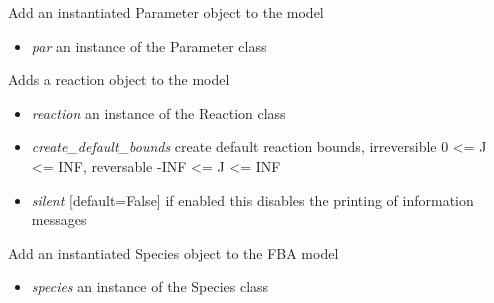 \documentclass[a4paper,11pt,english]{sphinxmanual}
\begin{document}
\begin{fulllineitems}
\begin{fulllineitems}
\label{modules_doc:cbmpy.CBModel.Model.addParameter}
Add an instantiated Parameter object to the model
\begin{itemize}
\item {} 
\emph{par} an instance of the Parameter class

\end{itemize}

\end{fulllineitems}


\begin{fulllineitems}
\label{modules_doc:cbmpy.CBModel.Model.addReaction}
Adds a reaction object to the model
\begin{itemize}
\item {} 
\emph{reaction} an instance of the Reaction class

\item {} 
\emph{create\_default\_bounds} create default reaction bounds, irreversible 0 \textless{}= J \textless{}= INF, reversable -INF \textless{}= J \textless{}= INF

\item {} 
\emph{silent} {[}default=False{]} if enabled this disables the printing of information messages

\end{itemize}

\end{fulllineitems}


\begin{fulllineitems}
\label{modules_doc:cbmpy.CBModel.Model.addSpecies}
Add an instantiated Species object to the FBA model
\begin{itemize}
\item {} 
\emph{species} an instance of the Species class

\end{itemize}

\end{fulllineitems}



\end{fulllineitems}
\end{document}
